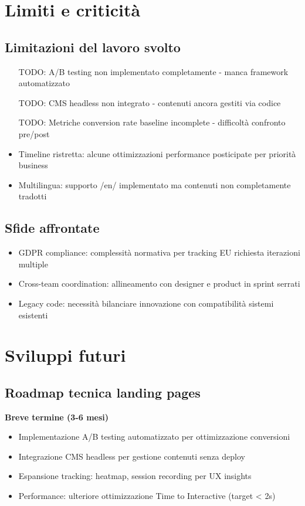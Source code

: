 \section{Limiti e criticità}
\subsection{Limitazioni del lavoro svolto}
\begin{itemize}
  \item [TODO: A/B testing non implementato completamente - manca framework automatizzato]
  \item [TODO: CMS headless non integrato - contenuti ancora gestiti via codice]
  \item [TODO: Metriche conversion rate baseline incomplete - difficoltà confronto pre/post]
  \item Timeline ristretta: alcune ottimizzazioni performance posticipate per priorità business
  \item Multilingua: supporto /en/ implementato ma contenuti non completamente tradotti
\end{itemize}

\subsection{Sfide affrontate}
\begin{itemize}
  \item GDPR compliance: complessità normativa per tracking EU richiesta iterazioni multiple
  \item Cross-team coordination: allineamento con designer e product in sprint serrati
  \item Legacy code: necessità bilanciare innovazione con compatibilità sistemi esistenti
\end{itemize}

\section{Sviluppi futuri}
\subsection{Roadmap tecnica landing pages}
\textbf{Breve termine (3-6 mesi)}
\begin{itemize}
  \item Implementazione A/B testing automatizzato per ottimizzazione conversioni
  \item Integrazione CMS headless per gestione contenuti senza deploy
  \item Espansione tracking: heatmap, session recording per UX insights
  \item Performance: ulteriore ottimizzazione Time to Interactive (target < 2s)
\end{itemize}

